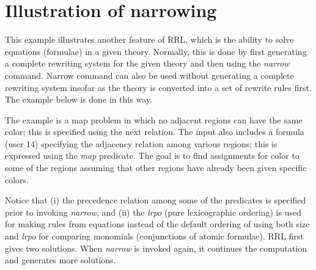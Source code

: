 \chapter{Illustration of narrowing}
\normalsize
\rm
This example illustrates another feature of RRL, which is the ability
to solve equations (formulae) in a given theory. Normally, this is
done by first generating a complete rewriting system for the given
theory and then using the {\em narrow} command. Narrow command can
also be used without generating a complete rewriting system insofar as
the theory is converted into a set of rewrite rules first. The example
below is done in this way. 

The example is a map problem in which
no adjacent regions can have the same color; this is specified
using the next relation. The input also
includes a formula (user 14) specifying
the adjacency relation among
various regions;
this is expressed using the {\em map} predicate. The goal is to find assignments for color
to some of the regions assuming that other regions have already
been given specific colors.

Notice that (i) the precedence relation among some of
the predicates is specified prior to invoking {\em narrow}, and (ii)
the {\sl lrpo} (pure lexicographic ordering) is used for 
making rules from equations instead of the default ordering
of using both size and {\sl lrpo} for comparing monomials (conjunctions
of atomic formulae).
RRL first gives two solutions. When {\em narrow}
is invoked again, it continues the computation and generates more
solutions.

